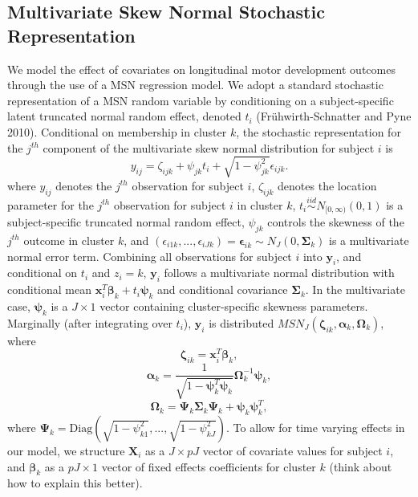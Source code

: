 \documentclass{article}
\begin{document}
\subsection{Multivariate Skew Normal Stochastic Representation}

We model the effect of covariates on longitudinal motor development outcomes through the use of a MSN regression model. We adopt a standard stochastic representation of a MSN random variable by conditioning on a subject-specific latent truncated normal random effect, denoted $t_i$ (Fr\"{u}hwirth-Schnatter and Pyne 2010). Conditional on membership in cluster $k$, the stochastic representation for the $j^{th}$ component of the multivariate skew normal distribution for subject $i$ is 
\begin{equation}
y_{ij} = \zeta_{ijk} +  \psi_{jk} t_i + \sqrt{1-\psi^2_{jk}}\epsilon_{ijk}.
\end{equation}
where $y_{ij}$ denotes the $j^{th}$ observation for subject $i$, $\zeta_{ijk}$ denotes the location parameter for the $j^{th}$ observation for subject $i$ in cluster $k$, $t_i \stackrel{iid}{\sim} N_{[0,\infty)}(0,1)$ is a subject-specific truncated normal random effect, $\psi_{jk}$ controls the skewness of the $j^{th}$ outcome in cluster $k$, and $(\epsilon_{i1k},...,\epsilon_{iJk}) = \boldsymbol\epsilon_{ik} \sim N_J(0,\boldsymbol\Sigma_k)$ is a multivariate normal error term. Combining all observations for subject $i$ into $\mathbf{y}_i$, and conditional on $t_i$ and $z_i = k$, $\mathbf{y}_i$ follows a multivariate normal distribution with conditional mean $\mathbf{x}_i^T \boldsymbol\beta_k + t_i \boldsymbol\psi_k$ and conditional covariance $\boldsymbol\Sigma_k$. In the multivariate case, $\boldsymbol\psi_k$ is a $J \times 1$ vector containing cluster-specific skewness parameters. Marginally (after integrating over $t_i$), $\mathbf{y}_i$ is distributed $MSN_J(\boldsymbol\zeta_{ik}, \boldsymbol\alpha_k, \boldsymbol\Omega_k)$, where
$$\boldsymbol\zeta_{ik} = \mathbf{x}_i^T \boldsymbol\beta_k,$$
$$\boldsymbol\alpha_k = \frac{1}{\sqrt{1 - \boldsymbol\psi_k^T \boldsymbol\psi_k}} \boldsymbol\Omega^{-1}_k\boldsymbol\psi_k,$$
$$\boldsymbol\Omega_k = \boldsymbol\Psi_k \boldsymbol\Sigma_k \boldsymbol\Psi_k + \boldsymbol\psi_k \boldsymbol\psi_k^T,$$
where $\boldsymbol\Psi_k = \text{Diag}\left ( \sqrt{1 - \psi^2_{k1}},...,\sqrt{1 - \psi^2_{kJ}} \right )$. To allow for time varying effects in our model, we structure $\mathbf{X}_i$ as a $J \times pJ$ vector of covariate values for subject $i$, and $\boldsymbol\beta_k$ as a $pJ \times 1$ vector of fixed effects coefficients for cluster $k$ (think about how to explain this better). 
\end{document}
